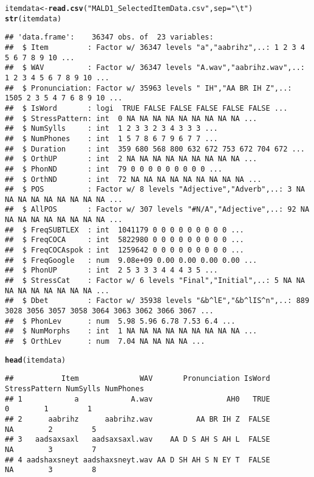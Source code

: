 \documentclass{article}\usepackage[]{graphicx}\usepackage[]{color}
\makeatletter
\newcommand{\hlstr}[1]{\textcolor[rgb]{0.192,0.494,0.8}{#1}}%
\newcommand{\hlstd}[1]{\textcolor[rgb]{0.345,0.345,0.345}{#1}}%
\newcommand{\hlkwb}[1]{\textcolor[rgb]{0.69,0.353,0.396}{#1}}%
\newcommand{\hlkwc}[1]{\textcolor[rgb]{0.333,0.667,0.333}{#1}}%
\newcommand{\hlkwd}[1]{\textcolor[rgb]{0.737,0.353,0.396}{\textbf{#1}}}%
\newenvironment{kframe}{%
 \def\at@end@of@kframe{}%
 \ifinner\ifhmode%
  \def\at@end@of@kframe{\end{minipage}}%
  \begin{minipage}{\columnwidth}%
 \fi\fi%
 \def\FrameCommand##1{\hskip\@totalleftmargin \hskip-\fboxsep
 \colorbox{shadecolor}{##1}\hskip-\fboxsep
     \hskip-\linewidth \hskip-\@totalleftmargin \hskip\columnwidth}%
 \MakeFramed {\advance\hsize-\width
   \@totalleftmargin\z@ \linewidth\hsize
   \@setminipage}}%
 {\par\unskip\endMakeFramed%
 \at@end@of@kframe}
\newenvironment{knitrout}{}{} %
\makeatother
\begin{document}
\begin{knitrout}
\begin{kframe}
\begin{alltt}
\hlstd{itemdata} \hlkwb{<-} \hlkwd{read.csv}\hlstd{(}\hlstr{"MALD1_SelectedItemData.csv"}\hlstd{,} \hlkwc{sep} \hlstd{=} \hlstr{"\textbackslash{}t"}\hlstd{)}
\hlkwd{str}\hlstd{(itemdata)}
\end{alltt}
\begin{verbatim}
## 'data.frame':	36347 obs. of  23 variables:
##  $ Item         : Factor w/ 36347 levels "a","aabrihz",..: 1 2 3 4 5 6 7 8 9 10 ...
##  $ WAV          : Factor w/ 36347 levels "A.wav","aabrihz.wav",..: 1 2 3 4 5 6 7 8 9 10 ...
##  $ Pronunciation: Factor w/ 35963 levels " IH","AA BR IH Z",..: 1505 2 3 5 4 7 6 8 9 10 ...
##  $ IsWord       : logi  TRUE FALSE FALSE FALSE FALSE FALSE ...
##  $ StressPattern: int  0 NA NA NA NA NA NA NA NA NA ...
##  $ NumSylls     : int  1 2 3 3 2 3 4 3 3 3 ...
##  $ NumPhones    : int  1 5 7 8 6 7 9 6 7 7 ...
##  $ Duration     : int  359 680 568 800 632 672 753 672 704 672 ...
##  $ OrthUP       : int  2 NA NA NA NA NA NA NA NA NA ...
##  $ PhonND       : int  79 0 0 0 0 0 0 0 0 0 ...
##  $ OrthND       : int  72 NA NA NA NA NA NA NA NA NA ...
##  $ POS          : Factor w/ 8 levels "Adjective","Adverb",..: 3 NA NA NA NA NA NA NA NA NA ...
##  $ AllPOS       : Factor w/ 307 levels "#N/A","Adjective",..: 92 NA NA NA NA NA NA NA NA NA ...
##  $ FreqSUBTLEX  : int  1041179 0 0 0 0 0 0 0 0 0 ...
##  $ FreqCOCA     : int  5822980 0 0 0 0 0 0 0 0 0 ...
##  $ FreqCOCAspok : int  1259642 0 0 0 0 0 0 0 0 0 ...
##  $ FreqGoogle   : num  9.08e+09 0.00 0.00 0.00 0.00 ...
##  $ PhonUP       : int  2 5 3 3 3 4 4 4 3 5 ...
##  $ StressCat    : Factor w/ 6 levels "Final","Initial",..: 5 NA NA NA NA NA NA NA NA NA ...
##  $ Dbet         : Factor w/ 35938 levels "&b^lE","&b^lIS^n",..: 889 3028 3056 3057 3058 3064 3063 3062 3066 3067 ...
##  $ PhonLev      : num  5.98 5.96 6.78 7.53 6.4 ...
##  $ NumMorphs    : int  1 NA NA NA NA NA NA NA NA NA ...
##  $ OrthLev      : num  7.04 NA NA NA NA ...
\end{verbatim}
\begin{alltt}
\hlkwd{head}\hlstd{(itemdata)}
\end{alltt}
\begin{verbatim}
##           Item              WAV       Pronunciation IsWord StressPattern NumSylls NumPhones
## 1            a            A.wav                 AH0   TRUE             0        1         1
## 2      aabrihz      aabrihz.wav          AA BR IH Z  FALSE            NA        2         5
## 3   aadsaxsaxl   aadsaxsaxl.wav    AA D S AH S AH L  FALSE            NA        3         7
## 4 aadshaxsneyt aadshaxsneyt.wav AA D SH AH S N EY T  FALSE            NA        3         8

\end{verbatim}
\end{kframe}
\end{knitrout}
\end{document}
